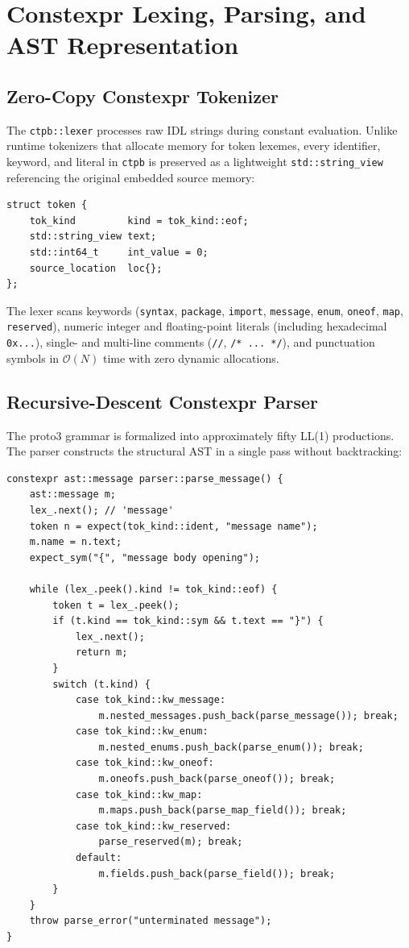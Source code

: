 \section{Constexpr Lexing, Parsing, and AST Representation}

\subsection{Zero-Copy Constexpr Tokenizer}
The \texttt{ctpb::lexer} processes raw IDL strings during constant evaluation. Unlike runtime tokenizers that allocate memory for token lexemes, every identifier, keyword, and literal in \texttt{ctpb} is preserved as a lightweight \texttt{std::string\_view} referencing the original embedded source memory:

\begin{lstlisting}[language=ModernC++, caption={Token Structure in \texttt{ctpb}}]
struct token {
    tok_kind         kind = tok_kind::eof;
    std::string_view text;
    std::int64_t     int_value = 0;
    source_location  loc{};
};
\end{lstlisting}

The lexer scans keywords (\texttt{syntax}, \texttt{package}, \texttt{import}, \texttt{message}, \texttt{enum}, \texttt{oneof}, \texttt{map}, \texttt{reserved}), numeric integer and floating-point literals (including hexadecimal \texttt{0x...}), single- and multi-line comments (\texttt{//}, \texttt{/* ... */}), and punctuation symbols in $\mathcal{O}(N)$ time with zero dynamic allocations.

\subsection{Recursive-Descent Constexpr Parser}
The proto3 grammar is formalized into approximately fifty LL(1) productions. The parser constructs the structural AST in a single pass without backtracking:

\begin{lstlisting}[language=ModernC++, caption={Constexpr Message Parsing}]
constexpr ast::message parser::parse_message() {
    ast::message m;
    lex_.next(); // 'message'
    token n = expect(tok_kind::ident, "message name");
    m.name = n.text;
    expect_sym("{", "message body opening");

    while (lex_.peek().kind != tok_kind::eof) {
        token t = lex_.peek();
        if (t.kind == tok_kind::sym && t.text == "}") {
            lex_.next();
            return m;
        }
        switch (t.kind) {
            case tok_kind::kw_message: 
                m.nested_messages.push_back(parse_message()); break;
            case tok_kind::kw_enum:    
                m.nested_enums.push_back(parse_enum()); break;
            case tok_kind::kw_oneof:   
                m.oneofs.push_back(parse_oneof()); break;
            case tok_kind::kw_map:     
                m.maps.push_back(parse_map_field()); break;
            case tok_kind::kw_reserved: 
                parse_reserved(m); break;
            default:                   
                m.fields.push_back(parse_field()); break;
        }
    }
    throw parse_error("unterminated message");
}
\end{lstlisting}

